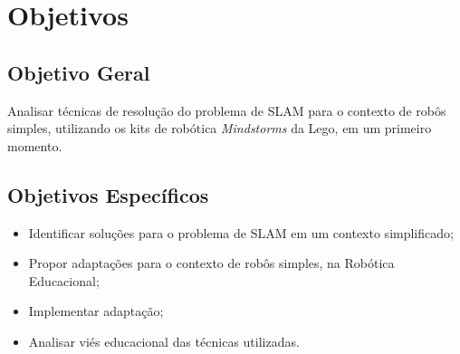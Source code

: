 	\section{Objetivos}

	\subsection{Objetivo Geral} %
	\label{sub:objetivos_gerais}

		Analisar técnicas de resolução do problema de SLAM para o contexto de robôs simples, utilizando os kits de robótica \textit{Mindstorms} da Lego, em um primeiro momento.


	\subsection{Objetivos Específicos} %
	\label{sub:objetivos_específicos}

	\begin{itemize}
		\item Identificar soluções para o problema de SLAM em um contexto simplificado;
		\item Propor adaptações para o contexto de robôs simples, na Robótica Educacional;
		\item Implementar adaptação;
		\item Analisar viés educacional das técnicas utilizadas.
	\end{itemize}


